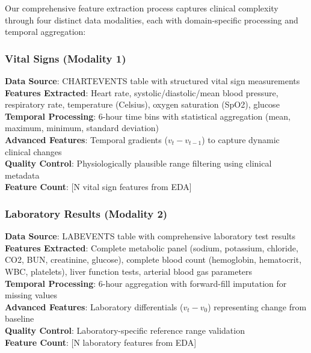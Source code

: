 \documentclass[11pt]{article}
\begin{document}
Our comprehensive feature extraction process captures clinical complexity through four distinct data modalities, each with domain-specific processing and temporal aggregation:

\subsubsection{Vital Signs (Modality 1)}
\textbf{Data Source}: CHARTEVENTS table with structured vital sign measurements
\\
\textbf{Features Extracted}: Heart rate, systolic/diastolic/mean blood pressure, respiratory rate, temperature (Celsius), oxygen saturation (SpO2), glucose
\\
\textbf{Temporal Processing}: 6-hour time bins with statistical aggregation (mean, maximum, minimum, standard deviation)
\\
\textbf{Advanced Features}: Temporal gradients ($v_t - v_{t-1}$) to capture dynamic clinical changes
\\
\textbf{Quality Control}: Physiologically plausible range filtering using clinical metadata
\\
\textbf{Feature Count}: [N vital sign features from EDA]

\subsubsection{Laboratory Results (Modality 2)}
\textbf{Data Source}: LABEVENTS table with comprehensive laboratory test results
\\
\textbf{Features Extracted}: Complete metabolic panel (sodium, potassium, chloride, CO2, BUN, creatinine, glucose), complete blood count (hemoglobin, hematocrit, WBC, platelets), liver function tests, arterial blood gas parameters
\\
\textbf{Temporal Processing}: 6-hour aggregation with forward-fill imputation for missing values
\\
\textbf{Advanced Features}: Laboratory differentials ($v_t - v_0$) representing change from baseline
\\
\textbf{Quality Control}: Laboratory-specific reference range validation
\\
\textbf{Feature Count}: [N laboratory features from EDA]
\end{document}
